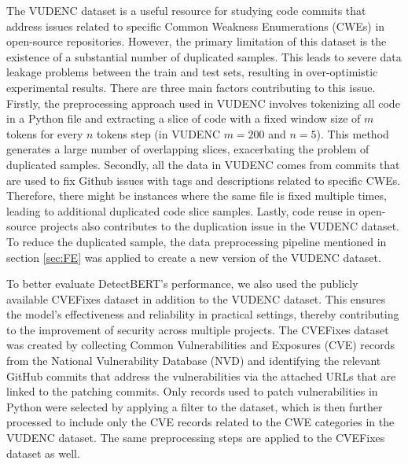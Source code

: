 \documentclass{ieeeaccess}
\begin{document}
\par The VUDENC dataset \cite{VUDENC} is a useful resource for studying code commits that address issues related to  specific Common Weakness Enumerations (CWEs) in open-source repositories. However, the primary limitation of this dataset is the existence of a substantial number of duplicated samples. This leads to severe data leakage problems between the train and test sets, resulting in over-optimistic experimental results. There are three main factors contributing to this issue. Firstly, the preprocessing approach used in VUDENC involves tokenizing all code in a Python file and extracting a slice of code with a fixed window size of $m$ tokens for every $n$ tokens step (in VUDENC $m=200$ and $n=5$). This method generates a large number of overlapping slices, exacerbating the problem of duplicated samples. Secondly, all the data in VUDENC comes from commits that are used to fix Github issues with tags and descriptions related to specific CWEs. Therefore, there might be instances where the same file is fixed multiple times, leading to additional duplicated code slice samples. Lastly, code reuse in open-source projects also contributes to the duplication issue in the VUDENC dataset. To reduce the duplicated sample, the data preprocessing pipeline mentioned in section \ref{sec:FE}  was applied to create a new version of the VUDENC dataset.  

\par To better evaluate DetectBERT's performance, we also used the publicly available CVEFixes dataset in addition to the VUDENC dataset. This ensures the model's effectiveness and reliability in practical settings, thereby contributing to the improvement of security across multiple projects. The CVEFixes dataset was created by collecting Common Vulnerabilities and Exposures (CVE) records from the National Vulnerability Database (NVD) and identifying the relevant GitHub commits that address the vulnerabilities via the attached URLs that are linked to the patching commits. Only records used to patch vulnerabilities in Python were selected by applying a filter to the dataset, which is then further processed to include only the CVE records related to the CWE categories in the VUDENC dataset. The same preprocessing steps are applied to the CVEFixes dataset as well.
\end{document}
